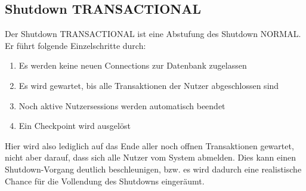       \subsection{Shutdown TRANSACTIONAL}
        Der Shutdown TRANSACTIONAL ist eine Abstufung des Shutdown NORMAL. Er führt folgende Einzelschritte durch:
        \begin{enumerate}
          \item Es werden keine neuen Connections zur Datenbank zugelassen
          \item Es wird gewartet, bis alle Transaktionen der Nutzer abgeschlossen sind
          \item Noch aktive Nutzersessions werden automatisch beendet
          \item Ein Checkpoint wird ausgelöst
        \end{enumerate}
        Hier wird also lediglich auf das Ende aller noch offnen Transaktionen gewartet, nicht aber darauf, dass sich alle Nutzer vom System abmelden. Dies kann einen Shutdown-Vorgang deutlich beschleunigen, bzw. es wird dadurch eine realistische Chance für die Vollendung des Shutdowns eingeräumt.
 
